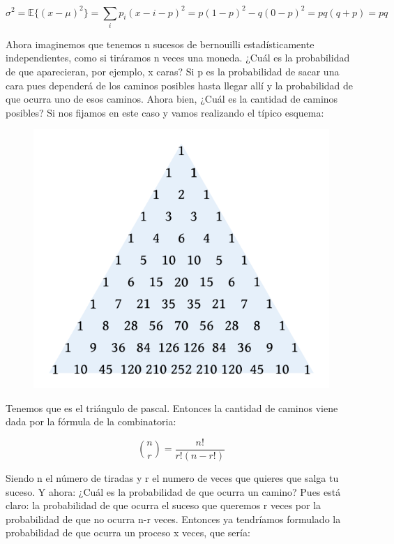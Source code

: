 \documentclass[12pt,a4paper]{book}
\newcommand{\EE}[1]{ \mathbb{E} \{ #1 \}  }
\begin{document}
$$ \sigma^2 = \EE{(x-\mu)^2} = \sum_i p_i(x-i-p)^2 = p(1-p)^2 - q(0-p)^2 = pq(q+p)=pq $$

Ahora imaginemos que tenemos n sucesos de bernouilli estadísticamente independientes, como si tiráramos n veces una moneda. ¿Cuál es la probabilidad de que aparecieran, por ejemplo, x caras? Si p es la probabilidad de sacar una cara pues dependerá de los caminos posibles hasta llegar allí y la probabilidad de que ocurra uno de esos caminos. Ahora bien, ¿Cuál es la cantidad de caminos posibles? Si nos fijamos en este caso y vamos realizando el típico esquema:

\begin{figure}[h!] \centering
\includegraphics[scale=0.3]{triangulo-pascal.png}
\end{figure}

Tenemos que es el triángulo de pascal. Entonces la cantidad de caminos viene dada por la fórmula de la combinatoria: 

\begin{equation}
\binom{n}{r}= \dfrac{n!}{r!(n-r!)}
\end{equation}

Siendo n el número de tiradas y r el numero de veces que quieres que salga tu suceso. Y ahora: ¿Cuál es la probabilidad de que ocurra un camino? Pues está claro: la probabilidad de que ocurra el suceso que queremos r veces por la probabilidad de que no ocurra n-r veces. Entonces ya tendríamos formulado la probabilidad de que ocurra un proceso x veces, que sería:
\end{document}
